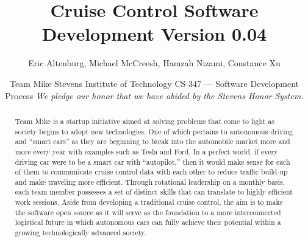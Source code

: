 \documentclass[preprint,11pt,3p]{article}
\title{Cruise Control Software Development Version 0.04}
\author{
Eric Altenburg, Michael McCreesh, Hamzah Nizami, Constance Xu}
\date{
	Team Mike\endgraf\bigskip
	Stevens Institute of Technology\endgraf\bigskip
	CS 347 — Software Development Process\endgraf\bigskip
	\textit{We pledge our honor that we have abided by the Stevens Honor System.}}
\begin{document}
\maketitle
\newpage

\tableofcontents
\newpage

\begin{abstract}
	Team Mike is a startup initiative aimed at solving problems that come to light as
society begins to adopt new technologies. One of which pertains to autonomous
driving and “smart cars” as they are beginning to break into the automobile
market more and more every year with examples such as Tesla and Ford. In a
perfect world, if every driving car were to be a smart car with “autopilot,” then
it would make sense for each of them to communicate cruise control data with
each other to reduce traffic build-up and make traveling more efficient. Through
rotational leadership on a monthly basis, each team member possesses a set of
distinct skills that can translate to highly efficient work sessions. Aside from
developing a traditional cruise control, the aim is to make the software open source as it will serve as the foundation to a more interconnected logistical future in which autonomous cars can fully achieve
their potential within a growing technologically advanced society. 
\end{abstract}
\end{document}
